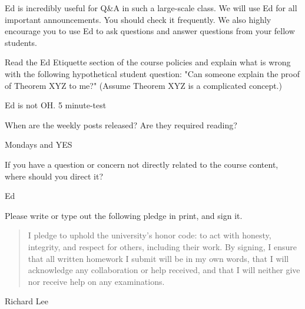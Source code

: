 \documentclass[11pt]{article}
\begin{document}

Ed is incredibly useful for Q\&A in such a large-scale class. We will use Ed for all important announcements. You should check it frequently. We also highly encourage you to use Ed to ask questions and answer questions from your fellow students.

\begin{Parts}
  
    \Part Read the Ed Etiquette section of the course policies and explain what is wrong with the following hypothetical student question: "Can someone explain the proof of Theorem XYZ to me?" (Assume Theorem XYZ is a complicated concept.)
    \begin{solution}
        Ed is not OH. 5 minute-test
    \end{solution}
    \Part When are the weekly posts released? Are they required reading?
    \begin{solution}
        Mondays and YES
    \end{solution}
    \Part If you have a question or concern not directly related to the course content, where should you direct it?
    \begin{solution}
        Ed
    \end{solution}
\end{Parts}


Please write or type out the following pledge in print, and sign it.

\begin{quote}
I pledge to uphold the university's honor code: to act with honesty, integrity, and respect for others, including their work. By signing, I ensure that all written homework I submit will be in my own words, that I will acknowledge any collaboration or help received, and that I will neither give nor receive help on any examinations. 
\end{quote}
\begin{solution}
    Richard Lee
\end{solution}
\end{document}
